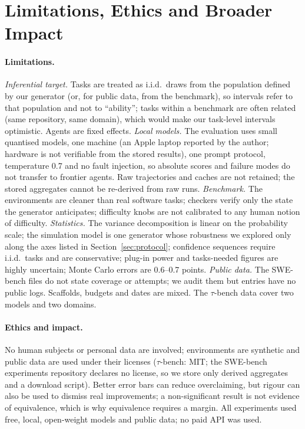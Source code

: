\section{Limitations, Ethics and Broader Impact}\label{sec:limits}
\paragraph{Limitations.}
\emph{Inferential target.} Tasks are treated as i.i.d.\ draws from the population defined by our generator (or, for public data, from the benchmark), so intervals refer to that population and not to ``ability''; tasks within a benchmark are often related (same repository, same domain), which would make our task-level intervals optimistic. Agents are fixed effects.
\emph{Local models.} The evaluation uses small quantised models, one machine (an Apple laptop reported by the author; hardware is not verifiable from the stored results), one prompt protocol, temperature 0.7 and no fault injection, so absolute scores and failure modes do not transfer to frontier agents. Raw trajectories and caches are not retained; the stored aggregates cannot be re-derived from raw runs.
\emph{Benchmark.} The environments are cleaner than real software tasks; checkers verify only the state the generator anticipates; difficulty knobs are not calibrated to any human notion of difficulty.
\emph{Statistics.} The variance decomposition is linear on the probability scale; the simulation model is one generator whose robustness we explored only along the axes listed in Section~\ref{sec:protocol}; confidence sequences require i.i.d.\ tasks and are conservative; plug-in power and tasks-needed figures are highly uncertain; Monte Carlo errors are 0.6--0.7 points.
\emph{Public data.} The SWE-bench files do not state coverage or attempts; we audit them but \sweNUnverif{} entries have no public logs. Scaffolds, budgets and dates are mixed. The $\tau$-bench data cover two models and two domains.
\paragraph{Ethics and impact.} No human subjects or personal data are involved; environments are synthetic and public data are used under their licenses ($\tau$-bench: MIT; the SWE-bench experiments repository declares no license, so we store only derived aggregates and a download script). Better error bars can reduce overclaiming, but rigour can also be used to dismiss real improvements; a non-significant result is not evidence of equivalence, which is why equivalence requires a margin. All experiments used free, local, open-weight models and public data; no paid API was used.

